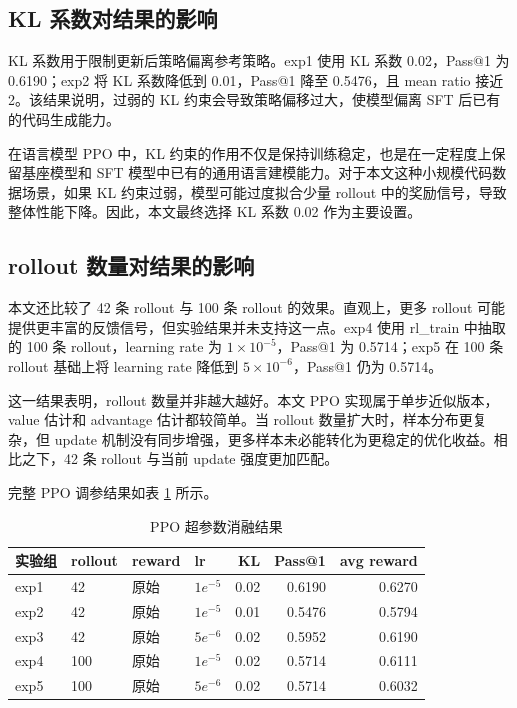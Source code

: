 \subsection{KL 系数对结果的影响}

KL 系数用于限制更新后策略偏离参考策略。exp1 使用 KL 系数 0.02，Pass@1 为 0.6190；exp2 将 KL 系数降低到 0.01，Pass@1 降至 0.5476，且 mean ratio 接近 2。该结果说明，过弱的 KL 约束会导致策略偏移过大，使模型偏离 SFT 后已有的代码生成能力。

在语言模型 PPO 中，KL 约束的作用不仅是保持训练稳定，也是在一定程度上保留基座模型和 SFT 模型中已有的通用语言建模能力。对于本文这种小规模代码数据场景，如果 KL 约束过弱，模型可能过度拟合少量 rollout 中的奖励信号，导致整体性能下降。因此，本文最终选择 KL 系数 0.02 作为主要设置。

\subsection{rollout 数量对结果的影响}

本文还比较了 42 条 rollout 与 100 条 rollout 的效果。直观上，更多 rollout 可能提供更丰富的反馈信号，但实验结果并未支持这一点。exp4 使用 rl\_train 中抽取的 100 条 rollout，learning rate 为 $1\times10^{-5}$，Pass@1 为 0.5714；exp5 在 100 条 rollout 基础上将 learning rate 降低到 $5\times10^{-6}$，Pass@1 仍为 0.5714。

这一结果表明，rollout 数量并非越大越好。本文 PPO 实现属于单步近似版本，value 估计和 advantage 估计都较简单。当 rollout 数量扩大时，样本分布更复杂，但 update 机制没有同步增强，更多样本未必能转化为更稳定的优化收益。相比之下，42 条 rollout 与当前 update 强度更加匹配。

完整 PPO 调参结果如表 \ref{tab:ppo-ablation} 所示。

\begin{table}[!htp]
  \centering
  \caption{PPO 超参数消融结果}
  \label{tab:ppo-ablation}
  \begin{tabular}{llllrrr}
    \toprule
    实验组 & rollout & reward & lr & KL & Pass@1 & avg reward \\
    \midrule
    exp1 & 42 & 原始 & $1e^{-5}$ & 0.02 & 0.6190 & 0.6270 \\
    exp2 & 42 & 原始 & $1e^{-5}$ & 0.01 & 0.5476 & 0.5794 \\
    exp3 & 42 & 原始 & $5e^{-6}$ & 0.02 & 0.5952 & 0.6190 \\
    exp4 & 100 & 原始 & $1e^{-5}$ & 0.02 & 0.5714 & 0.6111 \\
    exp5 & 100 & 原始 & $5e^{-6}$ & 0.02 & 0.5714 & 0.6032 \\
    \bottomrule
  \end{tabular}
\end{table}

